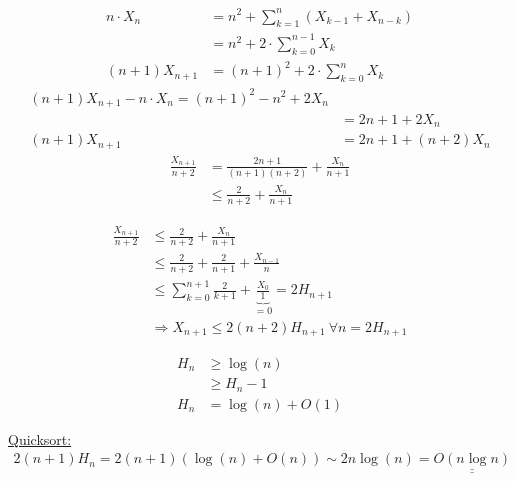 \begin{align*}
    n \cdot X_n &= n^2 + \sum_{k=1}^{n}(X_{k-1} + X_{n-k})\\
    &= n^2 + 2 \cdot \sum_{k =0}^{n-1} X_k\\
    (n+1) X_{n+1} &= (n+1)^2 + 2 \cdot \sum_{k=0}^n  X_k
\end{align*}
\begin{align*}
    (n+1)X_{n+1} - n \cdot X_n = (n+1)^2 - n^2 +2 X_n\\
    &= 2n +1 + 2X_n\\
    (n+1)X_{n+1} &= 2n + 1 + (n+2) X_n
\end{align*}
\begin{align*}
    \frac{X_{n+1}}{n+2} &= \frac{2n+1}{(n+1)(n+2)} + \frac{X_n}{n+1}\\
    &\leq \frac{2}{n+2} + \frac{X_n}{n+1}
\end{align*}

\begin{align*}
    \frac{X_{n+1}}{n+2} &\leq \frac{2}{n+2} + \frac{X_n}{n+1}\\
    &\leq \frac{2}{n+2} + \frac{2}{n+1} + \frac{X_{n-1}}{n}\\
    &\leq \sum_{k=0}^{n +1} \frac{2}{k+1} + \underbrace{\frac{X_0}{1}}_{=0} = 2 H_{n+1}\\
    &\Rightarrow X_{n+1} \leq 2(n+2) H_{n+1} \: \forall n = 2 H_{n+1}
\end{align*}

\begin{align*}
    H_n &\geq \log(n)\\
    &\geq H_n -1\\
    H_n &= \log(n) + O(1)
\end{align*}

\underline{Quicksort:}
\begin{align*}
    2(n+1) H_n = 2(n+1) (\log(n) + O(n)) \sim 2n\log(n) = \underline{\underline{O(n\log n)}}
\end{align*}